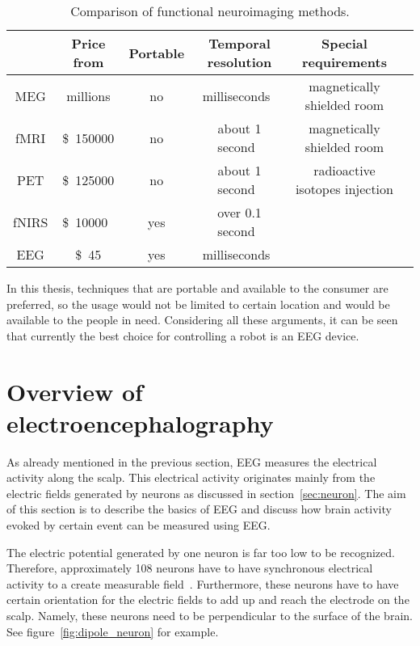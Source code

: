 
\begin{table}[h]
	\centering
	\begin{tabular}{|c|c|c|c|c|c|}\hline
			& Price	from				& Portable	& Temporal resolution		& Special requirements			\\\hline
\gls{MEG}	& millions\pMEG				& no		& milliseconds~\tresol		& magnetically shielded room	\\\hline
\gls{fMRI}	& \SI{150000}[\$]\pfMRI		& no		& about 1 second~\tresol	& magnetically shielded room	\\\hline
\gls{PET}	& \SI{125000}[\$]\pPET		& no		& about 1 second~\tresol	& radioactive isotopes injection\\\hline
\gls{fNIRS}	& \SI{10000}[\$]{}~\pNIRS	& yes		& over 0.1 second~\pNIRS	&								\\\hline
\gls{EEG}	& \SI{45}[\$]\pEEG			& yes		& milliseconds~\tresol		&								\\\hline
	\end{tabular}
	\caption{Comparison of functional neuroimaging methods.}
	\label{tab:neuroimaging}
\end{table}

In this thesis, techniques that are portable and available to the consumer are preferred, so the usage would not be limited to certain location and would be available to the people in need. Considering all these arguments, it can be seen that currently the best choice for controlling a robot is an \gls{EEG} device.

\section{Overview of electroencephalography}
\label{sec:EEG}

As already mentioned in the previous section, \gls{EEG} measures the electrical activity along the scalp. This electrical activity originates mainly from the electric fields generated by \glspl{neuron} as discussed in section~\ref{sec:neuron}. The aim of this section is to describe the basics of \gls{EEG} and discuss how brain activity evoked by certain event can be measured using \gls{EEG}.

The electric potential generated by one \gls{neuron} is far too low to be recognized. Therefore, approximately 108 \glspl{neuron} have to have synchronous electrical activity to a create measurable field~\cite{field_count}. Furthermore, these \glspl{neuron} have to have certain orientation for the electric fields to add up and reach the electrode on the scalp. Namely, these neurons need to be perpendicular to the surface of the brain. See figure~\ref{fig:dipole_neuron} for example.

